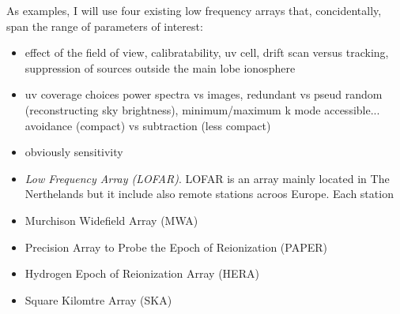 {As examples, I will use four existing low frequency arrays that, concidentally, span the range of parameters of interest:

\begin{itemize}
\item effect of the field of view, calibratability, uv cell, drift scan versus tracking, suppression of sources outside the main lobe ionosphere
\item uv coverage choices power spectra vs images, redundant vs pseud random (reconstructing sky brightness), minimum/maximum k mode accessible... avoidance (compact) vs subtraction (less compact)
\item obviously sensitivity

\item {\it Low Frequency Array (LOFAR)}. LOFAR is an array mainly located in The Nerthelands but it include also remote stations acroos Europe. Each station

\item Murchison Widefield Array (MWA)

\item Precision Array to Probe the Epoch of Reionization (PAPER)

\item Hydrogen Epoch of Reionization Array (HERA)

\item Square Kilomtre Array (SKA)

\end{itemize}


}
